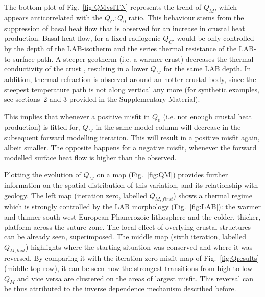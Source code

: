 The bottom plot of Fig.~\ref{fig:QMvsITN} represents the trend of $Q_M$, which appears anticorrelated with the ${Q_C:Q_0}$ ratio.
This behaviour stems from the suppression of basal heat flow that is observed for an increase in crustal heat production.
Basal heat flow, for a fixed radiogenic $Q_C$, would be only controlled by the depth of the LAB-isotherm and the series thermal resistance of the LAB-to-surface path.
A steeper geotherm (i.e. a warmer crust) decreases the thermal conductivity of the crust \parencite[see Eq.~\ref{eq:kTzChap86} here and ][]{Chapman1986}, resulting in a lower $Q_M$ for the same LAB depth.
In addition, thermal refraction is observed around an hotter crustal body, since the steepest temperature path is not along vertical any more (for synthetic examples, see sections~2 and 3 provided in the Supplementary Material).

This implies that whenever a positive misfit in $Q_0$ (i.e. not enough crustal heat production) is fitted for, $Q_M$ in the same model column will decrease in the subsequent forward modelling iteration.
This will result in a positive misfit again, albeit smaller.
The opposite happens for a negative misfit, whenever the forward modelled surface heat flow is higher than the observed.

Plotting the evolution of $Q_M$ on a map (Fig.~\ref{fig:QM}) provides further information on the spatial distribution of this variation, and its relationship with geology.
The left map (iteration zero, labelled $Q_{M,first}$) shows a thermal regime which is strongly controlled by the LAB morphology (Fig.~\ref{fig:LAB}): the warmer and thinner south-west European Phanerozoic lithosphere and the colder, thicker, platform across the suture zone.
The local effect of overlying crustal structures can be already seen, superimposed.
The middle map (sixth iteration, labelled $Q_{M,last}$) highlights where the starting situation was conserved and where it was reversed.
By comparing it with the iteration zero misfit map of Fig.~\ref{fig:Qresults} (middle top row), it can be seen how the strongest transitions from high to low $Q_M$ and vice versa are clustered on the areas of largest misfit.
This reversal can be thus attributed to the inverse dependence mechanism described before.

